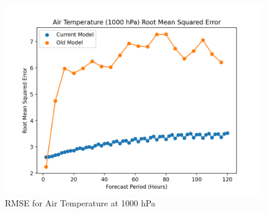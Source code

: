 \begin{appendices}
    \begin{figure}[H]
        \centering
        \includegraphics[width=.7\linewidth]{Plots/Results/Temperature/t1000_rmse.png}
        \caption{RMSE for Air Temperature at 1000 hPa}
    \end{figure}
\end{appendices}